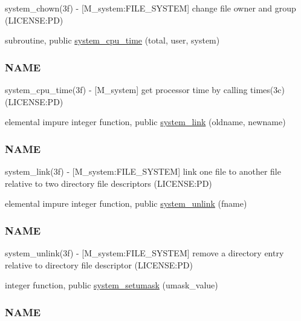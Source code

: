 \begin{DoxyCompactItemize}
\begin{DoxyCompactList}
system\+\_\+chown(3f) -\/ \mbox{[}M\+\_\+system\+:F\+I\+L\+E\+\_\+\+S\+Y\+S\+T\+EM\mbox{]} change file owner and group (L\+I\+C\+E\+N\+SE\+:PD) \end{DoxyCompactList}\item 
subroutine, public \mbox{\hyperlink{namespacem__system_a257d2b8987db850bc686507f19ccbe4a}{system\+\_\+cpu\+\_\+time}} (total, user, system)
\begin{DoxyCompactList}\small\item\em \subsubsection*{N\+A\+ME}

system\+\_\+cpu\+\_\+time(3f) -\/ \mbox{[}M\+\_\+system\mbox{]} get processor time by calling times(3c) (L\+I\+C\+E\+N\+SE\+:PD) \end{DoxyCompactList}\item 
elemental impure integer function, public \mbox{\hyperlink{namespacem__system_a0e04b5499fc3367eda9758b6e396a103}{system\+\_\+link}} (oldname, newname)
\begin{DoxyCompactList}\small\item\em \subsubsection*{N\+A\+ME}

system\+\_\+link(3f) -\/ \mbox{[}M\+\_\+system\+:F\+I\+L\+E\+\_\+\+S\+Y\+S\+T\+EM\mbox{]} link one file to another file relative to two directory file descriptors (L\+I\+C\+E\+N\+SE\+:PD) \end{DoxyCompactList}\item 
elemental impure integer function, public \mbox{\hyperlink{namespacem__system_a3561c9beafec28439f760d701d55a6b8}{system\+\_\+unlink}} (fname)
\begin{DoxyCompactList}\small\item\em \subsubsection*{N\+A\+ME}

system\+\_\+unlink(3f) -\/ \mbox{[}M\+\_\+system\+:F\+I\+L\+E\+\_\+\+S\+Y\+S\+T\+EM\mbox{]} remove a directory entry relative to directory file descriptor (L\+I\+C\+E\+N\+SE\+:PD) \end{DoxyCompactList}\item 
integer function, public \mbox{\hyperlink{namespacem__system_a04fd02e6f5ce2f8ecdfb577e1490feba}{system\+\_\+setumask}} (umask\+\_\+value)
\begin{DoxyCompactList}\small\item\em \subsubsection*{N\+A\+ME}


\end{DoxyCompactList}
\end{DoxyCompactItemize}
